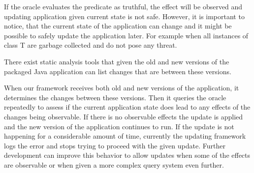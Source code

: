 If the oracle evaluates the predicate as truthful, the effect will be observed
and updating application given current state is not safe. However, it is
important to notice, that the current state of the application can change and it
might be possible to safely update the application later. For example when all
instances of class T are garbage collected and do not pose any threat.

There exist static analysis tools that given the old and new versions of the
packaged Java application can list changes that are between these versions.

When our framework receives both old and new versions of the application, it
determines the changes between these versions. Then it queries the oracle
repeatedly to assess if the current application state does lead to any effects
of the changes being observable. If there is no observable effects the update is
applied and the new version of the application continues to run.
If the update is not happening for a considerable amount of time, currently the
updating framework logs the error and stops trying to proceed with the given
update. Further development can improve this behavior to allow updates when some
of the effects are observable or when given a more complex query system even
further.